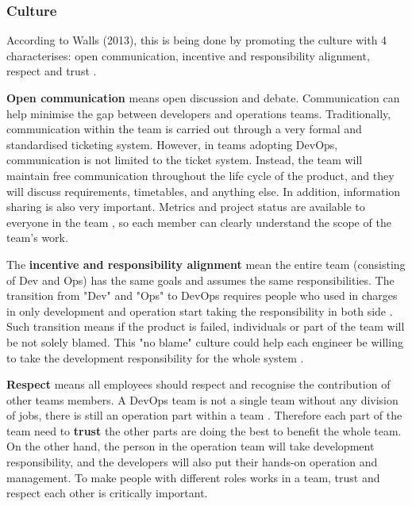 \subsubsection[]{Culture}
 According to Walls (2013), this is being done by promoting the culture with 4 characterises: open communication, incentive and responsibility alignment, respect and trust \cite{walls2013building}.
\par 
\textbf{Open communication} means open discussion and debate. Communication can help minimise the gap between developers and operations teams. Traditionally, communication within the team is carried out through a very formal and standardised ticketing system.
However, in teams adopting DevOps, communication is not limited to the ticket system. Instead, the team will maintain free communication throughout the life cycle of the product, and they will discuss requirements, timetables, and anything else. In addition, information sharing is also very important\cite{lwakatare2015dimensions}. Metrics and project status are available to everyone in the team \label{moniter}, so each member can clearly understand the scope of the team's work.
\par
The \textbf{incentive and responsibility alignment} mean the entire team (consisting of Dev and Ops) has the same goals and assumes the same responsibilities. The transition from "Dev" and "Ops" to DevOps requires people who used in charges in only development and operation start taking the responsibility in both side \cite{lwakatare2015dimensions}.
Such transition means if the product is failed, individuals or part of the team will be not solely blamed. 
This "no blame" culture could help each engineer be willing to take the development responsibility for the whole system \cite{feitelson2013development}.
\par 
\textbf{Respect} means all employees should respect and recognise the contribution of other teams members. A DevOps team is not a single team without any division of jobs, there is still an operation part within a team \cite{TheresNo86:online}. Therefore each part of the team need to \textbf{trust} the other parts are doing the best to benefit the whole team.
On the other hand, the person in the operation team will take development responsibility, and the developers will also put their hands-on operation and management\cite{shropshire2017uncertainty}. To make people with different roles works in a team, trust and respect each other is critically important. 
